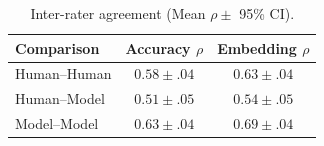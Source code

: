 
\begin{table}[t]
    \centering 
    \caption{Inter-rater agreement (Mean $\rho \pm$ 95\% CI).}
    \label{tab:agreement}
    \setlength{\tabcolsep}{4pt} %
    \begin{tabular}{l cc}
    \toprule
    Comparison & Accuracy $\rho$ & Embedding $\rho$ \\
    \midrule
    Human--Human & $0.58 \pm .04$ & $0.63 \pm .04$ \\
    Human--Model & $0.51 \pm .05$ & $0.54 \pm .05$ \\
    Model--Model & $0.63 \pm .04$ & $0.69 \pm .04$ \\
    \bottomrule
    \end{tabular}
    \end{table}
